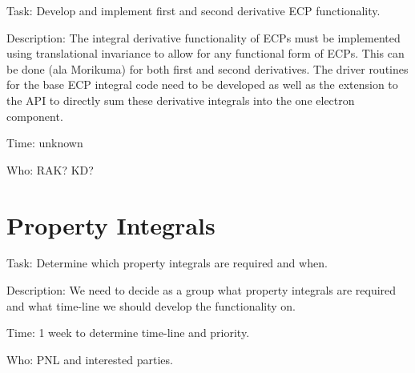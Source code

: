 Task: Develop and implement first and second derivative ECP
functionality. 

Description:  The integral derivative functionality of ECPs must be
implemented using translational invariance to allow for any functional
form of ECPs.  This can be done (ala Morikuma) for both first and
second derivatives.  The driver routines for the base ECP integral
code need to be developed as well as the extension to the API to
directly sum these derivative integrals into the one electron
component.  

Time: unknown

Who:  RAK? KD?


\section{Property Integrals}

Task:  Determine which property integrals are required and when.  

Description:  We need to decide as a group what property integrals are
required and what time-line we should develop the functionality on.  

Time: 1 week to determine time-line and priority.  

Who: PNL and interested parties.


